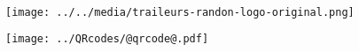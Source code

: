 
	{\AddToShipoutPicture*{\BackgroundA}}
	{\AddToShipoutPicture*{\BackgroundB}}



\begin{center}
	\color{white}
\\
\medskip
{}
\end{center}

\bigskip

\begin{minipage}[bottom]{0.30\textwidth}
	\begin{center}
		\texttt{[image: ../../media/traileurs-randon-logo-original.png]}
	\end{center}
\end{minipage}\hfill
\begin{minipage}[bottom]{0.35\textwidth}
	\begin{center}
		\color{white} 
	\end{center}
\end{minipage}\hfill
\begin{minipage}[bottom]{0.30\textwidth}
	\texttt{[image: ../QRcodes/@qrcode@.pdf]}
\end{minipage}


\newpage


